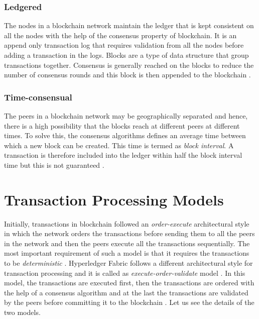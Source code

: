\documentclass[
  a4paper,  %
  twoside,  %
  bibliography=totoc,
  headsepline,
  cleardoublepage=empty,
  parskip=half,
  draft=false
]{scrbook}
\begin{document}
\subsubsection{Ledgered}
The nodes in a blockchain network maintain the ledger that is kept consistent on all the nodes with the help of the consensus property of blockchain. It is an append only transaction log that requires validation from all the nodes before adding a transaction in the logs. Blocks are a type of data structure that group transactions together. Consensus is generally reached on the blocks to reduce the number of consensus rounds and this block is then appended to the blockchain \cite{Salt}.

\subsubsection{Time-consensual}
The peers in a blockchain network may be geographically separated and hence, there is a high possibility that the blocks reach at different peers at different times. To solve this, the consensus algorithms defines an average time between which a new block can be created. This time is termed as \textit{block interval}. A transaction is therefore included into the ledger within half the block interval time but this is not guaranteed \cite{Salt}.

\section{Transaction Processing Models}
Initially, transactions in blockchain followed an \textit{order-execute} architectural style in which the network orders the transactions before sending them to all the peers in the network and then the peers execute all the transactions sequentially. The most important requirement of such a model is that it requires the transactions to be \textit{deterministic} \cite{HF}. Hyperledger Fabric follows a different architectural style for transaction processing and it is called as \textit{execute-order-validate} model \cite{HF}. In this model, the transactions are executed first, then the transactions are ordered with the help of a consensus algorithm and at the last the transactions are validated by the peers before committing it to the blockchain \cite{HF}. Let us see the details of the two models.
\end{document}

